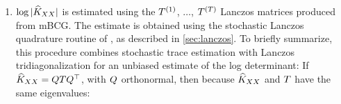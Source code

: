 \begin{enumerate}
  \item $\log \vert \widehat{K}_{XX} \vert$
    is estimated using the $T^{(1)}$, $\ldots$, $T^{(T)}$ Lanczos matrices produced from mBCG.
    The estimate is obtained using the stochastic Lanczos quadrature routine of \citet{ubaru2017fast}, as described in \cref{sec:lanczos}.
    To briefly summarize, this procedure combines stochastic trace estimation with Lanczos tridiagonalization for an unbiased estimate of the log determinant:
    If $\widehat{K}_{XX} = QTQ^{\top}$, with $Q$ orthonormal, then because $\widehat{K}_{XX}$ and $T$ have the same eigenvalues:
\end{enumerate}


